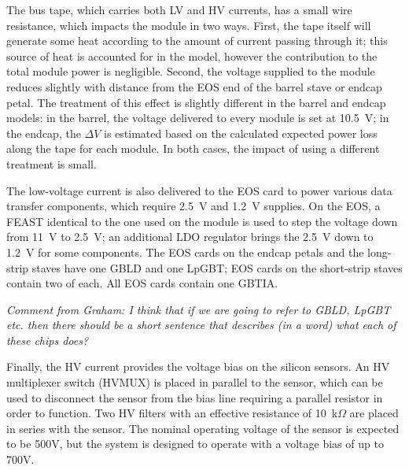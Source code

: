 The bus tape, which carries both LV and HV currents, has a small wire resistance, which impacts the
module in two ways. First,
the tape itself will generate some heat according to the amount of current passing through it; this
source of heat is accounted for in the model, however the contribution to the total module power
is negligible.
Second, the voltage supplied to the module reduces slightly with distance from the EOS end of the barrel stave or endcap petal.  
The treatment of this effect is slightly different in the barrel and
endcap models: in the barrel, the voltage delivered to every module is set at 10.5~V; in the endcap,
the $\Delta V$ is estimated based on the calculated expected power loss along the tape for each module.
In both cases, the impact of using a different treatment is small.

The low-voltage current is also delivered to the EOS card to power various data transfer components,
which require 2.5~V and 1.2~V supplies.
On the EOS, a FEAST identical to the one used on the module is used to step the voltage down from 11~V
to 2.5~V; an additional LDO regulator brings the 2.5~V down to 1.2~V for some components.
The EOS cards on the endcap petals and the long-strip staves have one GBLD and one LpGBT;
EOS cards on the short-strip staves contain two of each. All EOS cards contain one GBTIA.

\textit{Comment from Graham: I think that if we are going to refer to GBLD, LpGBT etc. then there should be a short sentence that describes (in a word) what each of these chips does?}

Finally, the HV current provides the voltage bias on the silicon sensors. An HV multiplexer
switch (HVMUX) is placed in parallel to the sensor, which can be used to disconnect the sensor from the
bias line requiring a parallel resistor in order to function. Two HV filters with an effective resistance of 10~k$\Omega$ are placed in series with the
sensor. The nominal operating voltage of the sensor is expected to be 500V, but the system is designed
to operate with a voltage bias of up to 700V.
